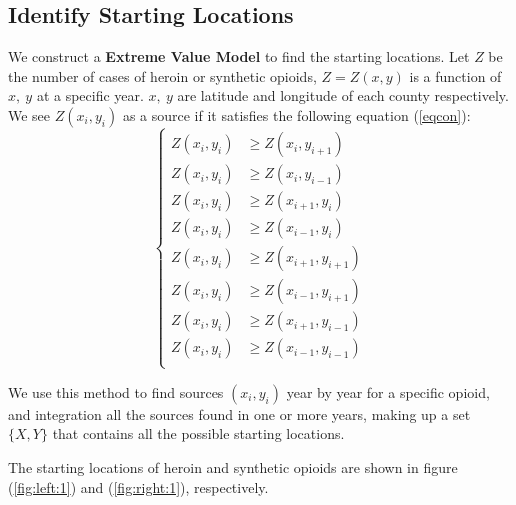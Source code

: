 \documentclass{mcmthesis}
\numberwithin{equation}{section}
\numberwithin{figure}{section}
\numberwithin{table}{section}
\theoremstyle{mydef}
\begin{document}
\subsection{Identify Starting Locations}
\label{evm}

We construct a  {\bf{Extreme Value Model}} to find the starting locations\cite{b3}. Let $Z$ be the number of cases of heroin or synthetic opioids, $Z = Z(x,y)$ is a function of $x,\ y$ at a specific year. $x,\ y$ are latitude and longitude of each county respectively. We see $Z(x_i,y_i)$ as a source if it satisfies the following equation (\ref{eqcon}):
\begin{equation}
\left\{
\begin{aligned}
Z(x_i,y_i)&\geqslant Z(x_{i},y_{i+1})\\
Z(x_i,y_i)&\geqslant Z(x_{i},y_{i-1})\\
Z(x_i,y_i)&\geqslant Z(x_{i+1},y_{i})\\
Z(x_i,y_i)&\geqslant Z(x_{i-1},y_{i})\\
Z(x_i,y_i)&\geqslant Z(x_{i+1},y_{i+1})\\
Z(x_i,y_i)&\geqslant Z(x_{i-1},y_{i+1})\\
Z(x_i,y_i)&\geqslant Z(x_{i+1},y_{i-1})\\
Z(x_i,y_i)&\geqslant Z(x_{i-1},y_{i-1})\\
\end{aligned}
\right.
\label{eqcon}
\end{equation}

We use this method to find sources $(x_i,y_i)$ year by year for a specific opioid, and integration all the sources found in one or more years, making up a set $\{X,Y\}$ that contains all the possible starting locations.

The starting locations of heroin and synthetic opioids are shown in figure (\ref{fig:left:1}) and (\ref{fig:right:1}), respectively.
\end{document}
